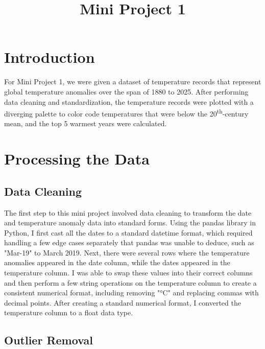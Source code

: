 \documentclass[conference]{IEEEtran}
\begin{document}
\title{Mini Project 1\\}

\author{
}

\maketitle

\section{Introduction}
For Mini Project 1, we were given a dataset of temperature records that represent global temperature anomalies over the span of 1880 to 2025. After performing data cleaning and standardization, the temperature records were plotted with a diverging palette to color code temperatures that were below the 20\textsuperscript{th}-century mean, and the top 5 warmest years were calculated.

\section{Processing the Data}

\subsection{Data Cleaning}

The first step to this mini project involved data cleaning to transform the date and temperature anomaly data into standard forms. Using the pandas library in Python, I first cast all the dates to a standard datetime format, which required handling a few edge cases separately that pandas was unable to deduce, such as "Mar-19" to March 2019. Next, there were several rows where the temperature anomalies appeared in the date column, while the dates appeared in the temperature column. I was able to swap these values into their correct columns and then perform a few string operations on the temperature column to create a consistent numerical format, including removing "°C" and replacing commas with decimal points. After creating a standard numerical format, I converted the temperature column to a float data type.

\subsection{Outlier Removal}
\end{document}
